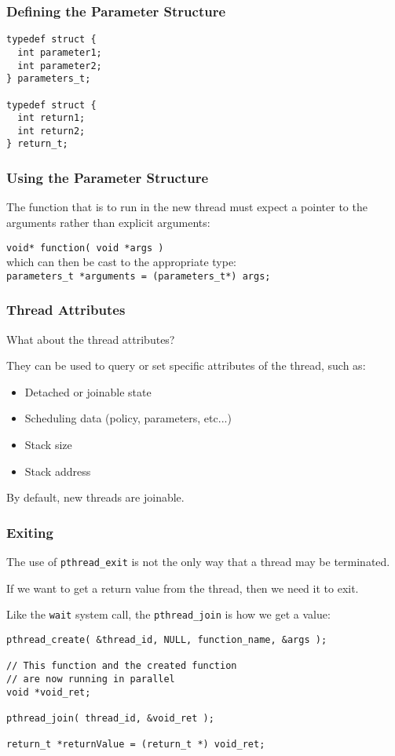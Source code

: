 \begin{frame}[fragile]
\frametitle{Defining the Parameter Structure}

\begin{verbatim}
typedef struct {
  int parameter1;
  int parameter2;
} parameters_t;

typedef struct {
  int return1;
  int return2;
} return_t;
\end{verbatim}

\end{frame}


\begin{frame}
\frametitle{Using the Parameter Structure}

The function that is to run in the new thread must expect a pointer to the arguments rather than explicit arguments:

\texttt{void* function( void *args )}\\
which can then be cast to the appropriate type:\\
\texttt{parameters\_t *arguments = (parameters\_t*) args;}



\end{frame}


\begin{frame}
\frametitle{Thread Attributes}

What about the thread attributes? 

They can be used to query or set specific attributes of the thread, such as:
\begin{itemize}
	\item Detached or joinable state
	\item Scheduling data (policy, parameters, etc...)
	\item Stack size
	\item Stack address
\end{itemize}

By default, new threads are joinable.

\end{frame}


\begin{frame}[fragile]
\frametitle{Exiting}

The use of \texttt{pthread\_exit} is not the only way that a thread may be terminated. 

If we want to get a return value from the thread, then we need it to exit. 

Like the \texttt{wait} system call, the \texttt{pthread\_join} is how we get a value:

\begin{verbatim}
pthread_create( &thread_id, NULL, function_name, &args );

// This function and the created function
// are now running in parallel 
void *void_ret;

pthread_join( thread_id, &void_ret );

return_t *returnValue = (return_t *) void_ret;
\end{verbatim}


\end{frame}


